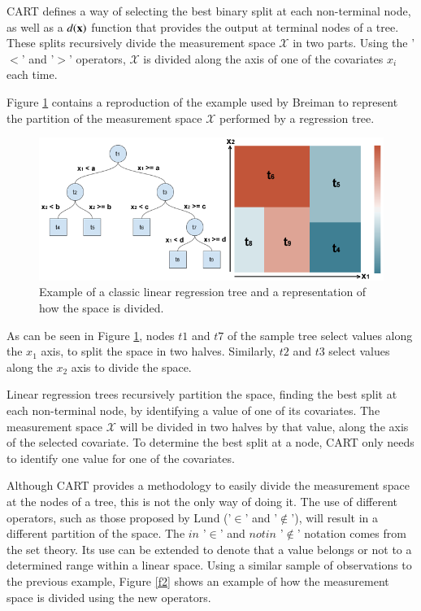 \documentclass[times,twocolumn,final,authoryear]{elsarticle}
\begin{document}
CART defines a way of selecting the best binary split at each non-terminal node, as well as a $d(\bf{x})$ function that provides the output at terminal nodes of a tree. These splits recursively divide the measurement space $\mathcal{X}$ in two parts. Using the '$<$' and '$>$' operators, $\mathcal{X}$ is divided along the axis of one of the covariates $x_i$ each time.

Figure \ref{f1} contains a reproduction of the example used by Breiman to represent the partition of the measurement space $\mathcal{X}$ performed by a regression tree.

\begin{figure}
  \includegraphics[width=17cm]{fig1_master.png}
\caption{Example of a classic linear regression tree and a representation of how the space is divided. }
\label{f1}       %
\end{figure}
%
 
As can be seen in Figure \ref{f1}, nodes $t1$ and $t7$ of the sample tree select values along the $x_1$ axis, to split the space in two halves. Similarly, $t2$ and $t3$ select values along the $x_2$ axis to divide the space.

Linear regression trees recursively partition the space, finding the best split at each non-terminal node, by identifying a value of one of its covariates. The measurement space $\mathcal{X}$ will be divided in two halves by that value, along the axis of the selected covariate. To determine the best split at a node, CART only needs to identify one value for one of the covariates.

Although CART provides a methodology to easily divide the measurement space at the nodes of a tree, this is not the only way of doing it. The use of different operators, such as those proposed by Lund ('$\in$' and '$\notin$'), will result in a different partition of the space. The $in$ '$\in$' and $not in$ '$\notin$' notation comes from the set theory. Its use can be extended to denote that a value belongs or not to a determined range within a linear space. Using a similar sample of observations to the previous example, Figure \ref{f2} shows an example of how the measurement space is divided using the new operators.
\end{document}
